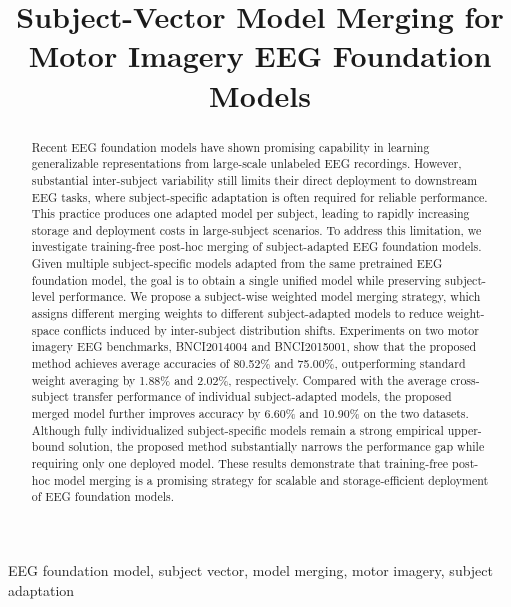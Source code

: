 \documentclass[conference]{IEEEtran}
\begin{document}
\title{Subject-Vector Model Merging for Motor Imagery EEG Foundation Models}

\author{
}

\maketitle

\begin{abstract}
Recent EEG foundation models have shown promising capability in learning generalizable representations from large-scale unlabeled EEG recordings. However, substantial inter-subject variability still limits their direct deployment to downstream EEG tasks, where subject-specific adaptation is often required for reliable performance. This practice produces one adapted model per subject, leading to rapidly increasing storage and deployment costs in large-subject scenarios. To address this limitation, we investigate training-free post-hoc merging of subject-adapted EEG foundation models. Given multiple subject-specific models adapted from the same pretrained EEG foundation model, the goal is to obtain a single unified model while preserving subject-level performance. We propose a subject-wise weighted model merging strategy, which assigns different merging weights to different subject-adapted models to reduce weight-space conflicts induced by inter-subject distribution shifts. Experiments on two motor imagery EEG benchmarks, BNCI2014004 and BNCI2015001, show that the proposed method achieves average accuracies of 80.52\% and 75.00\%, outperforming standard weight averaging by 1.88\% and 2.02\%, respectively. Compared with the average cross-subject transfer performance of individual subject-adapted models, the proposed merged model further improves accuracy by 6.60\% and 10.90\% on the two datasets. Although fully individualized subject-specific models remain a strong empirical upper-bound solution, the proposed method substantially narrows the performance gap while requiring only one deployed model. These results demonstrate that training-free post-hoc model merging is a promising strategy for scalable and storage-efficient deployment of EEG foundation models.
\end{abstract}

\begin{IEEEkeywords}
EEG foundation model, subject vector, model merging, motor imagery, subject adaptation
\end{IEEEkeywords}
\end{document}
